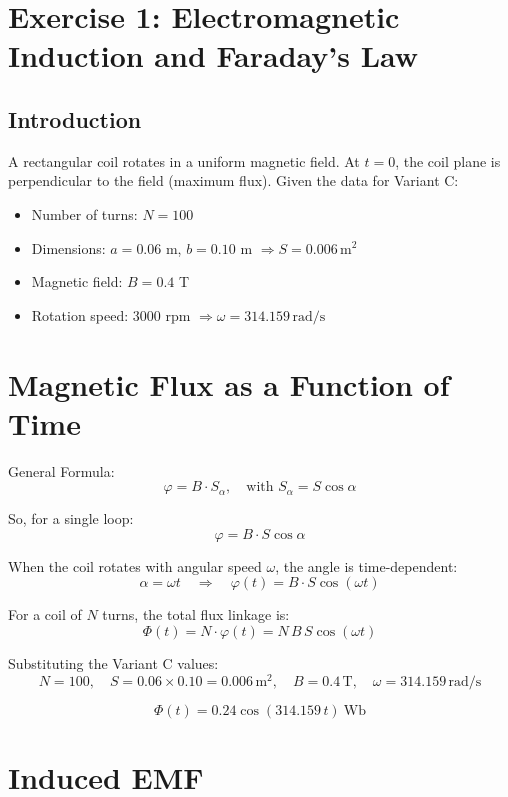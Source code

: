 \documentclass{article}
\begin{document}
\section*{Exercise 1: Electromagnetic Induction and Faraday's Law}

\subsection*{Introduction}
A rectangular coil rotates in a uniform magnetic field. 
At $t=0$, the coil plane is perpendicular to the field (maximum flux). 
Given the data for Variant C:

\begin{itemize}
  \item Number of turns: $N = 100$
  \item Dimensions: $a = 0.06$ m, $b = 0.10$ m $\Rightarrow S = 0.006 \,\text{m}^2$
  \item Magnetic field: $B = 0.4$ T
  \item Rotation speed: $3000$ rpm $\Rightarrow \omega = 314.159 \,\text{rad/s}$
\end{itemize}

\section{Magnetic Flux as a Function of Time} %

General Formula:
\[
\varphi = B \cdot S_\alpha, \quad \text{with } S_\alpha = S \cos \alpha
\]

So, for a single loop:
\[
\varphi = B \cdot S \cos \alpha
\]

When the coil rotates with angular speed $\omega$, the angle is time-dependent:
\[
\alpha = \omega t \quad \Rightarrow \quad \varphi(t) = B \cdot S \cos(\omega t)
\]

For a coil of $N$ turns, the total flux linkage is:
\[
\Phi(t) = N \cdot \varphi(t) = N \, B \, S \cos(\omega t)
\]

\noindent
Substituting the Variant C values:
\[
N = 100, \quad S = 0.06 \times 0.10 = 0.006 \,\text{m}^2, \quad B = 0.4 \,\text{T}, \quad \omega = 314.159 \,\text{rad/s}
\]

\[
\boxed{\;\Phi(t) = 0.24 \cos(314.159\,t) \ \text{Wb}\;}
\]


\section{Induced EMF} %
\end{document}
